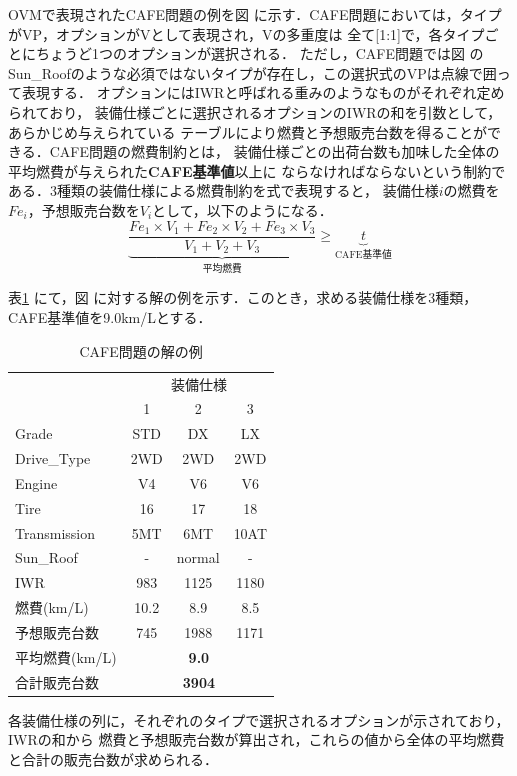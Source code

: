 OVMで表現されたCAFE問題の例を図%
に示す．CAFE問題においては，タイプがVP，オプションがVとして表現され，Vの多重度は
全て[1:1]で，各タイプごとにちょうど1つのオプションが選択される．
ただし，CAFE問題では図%
のSun\_Roofのような必須ではないタイプが存在し，この選択式のVPは点線で囲って表現する．
オプションにはIWRと呼ばれる重みのようなものがそれぞれ定められており，
装備仕様ごとに選択されるオプションのIWRの和を引数として，あらかじめ与えられている
テーブルにより燃費と予想販売台数を得ることができる．CAFE問題の燃費制約とは，
装備仕様ごとの出荷台数も加味した全体の平均燃費が与えられた\textbf{CAFE基準値}以上に
ならなければならないという制約である．3種類の装備仕様による燃費制約を式で表現すると，
装備仕様$i$の燃費を$Fe_i$，予想販売台数を$V_i$として，以下のようになる．
\vspace{1em}
 \begin{displaymath}
   \underbrace{
   \frac{Fe_{1} \times V_1 + Fe_{2} \times V_2 + Fe_{3} \times V_3 }{V_1 + V_2 + V_3}
   }_{\mbox{平均燃費}}
   \geq 
   \underbrace{t}_{\mbox{CAFE基準値}}
  \end{displaymath}
\vspace{1em}

表\ref{tab:ovm_ans}
にて，図%
に対する解の例を示す．このとき，求める装備仕様を3種類，CAFE基準値を9.0km/Lとする．
\begin{table}[tb]
 \caption{CAFE問題の解の例}
 \begin{tabular}{l|c|c|c} \bhline
    \multicolumn{1}{c|}{装備}   & \multicolumn{3}{c}{装備仕様} \\ \cline{2-4}
                 & 1	& 2 	 & 3	\\  \hline
    Grade	 & STD	& DX	 & LX	\\
    Drive\_Type  & 2WD  & 2WD    & 2WD  \\
    Engine	 & V4	& V6	 & V6	\\
    Tire	 & 16	& 17	 & 18	\\
    Transmission & 5MT	& 6MT    & 10AT	\\
    Sun\_Roof    & -    & normal & -    \\ \hline
    IWR          & 983  & 1125   & 1180 \\ %
    燃費(km/L)    & 10.2  & 8.9     & 8.5 \\ %
    予想販売台数  & 745  & 1988   & 1171  \\ \hline
    平均燃費(km/L) & \multicolumn{3}{c}{\bf{9.0}} \\ 
    合計販売台数  & \multicolumn{3}{c}{\bf{3904}} \\ \hline
 \end{tabular}
 \label{tab:ovm_ans}
\end{table}
各装備仕様の列に，それぞれのタイプで選択されるオプションが示されており，IWRの和から
燃費と予想販売台数が算出され，これらの値から全体の平均燃費と合計の販売台数が求められる．






